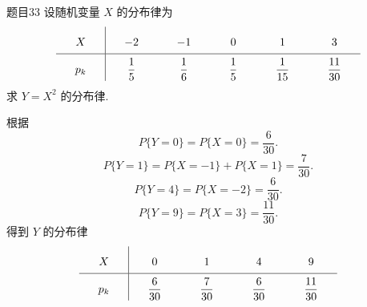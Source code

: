 \begin{question}{题目33}
    设随机变量 $X$ 的分布律为
    $$
        \renewcommand\arraystretch{2}
        \setlength{\arraycolsep}{6mm}
        \begin{array}{c|ccccc}
            X   & -2           & -1           & 0            & 1             & 3              \\
            \hline
            p_k & \dfrac{1}{5} & \dfrac{1}{6} & \dfrac{1}{5} & \dfrac{1}{15} & \dfrac{11}{30} \\
        \end{array}
    $$
    求 $Y=X^2$ 的分布律.
\end{question}
\begin{solution}
    根据
    $$
        P\{Y=0\} = P\{X=0\} = \frac{6}{30}.
    $$
    $$
        P\{Y=1\} = P\{X=-1\} + P\{X=1\} = \frac{7}{30}.
    $$
    $$
        P\{Y=4\} = P\{X=-2\} = \frac{6}{30}.
    $$
    $$
        P\{Y=9\} = P\{X=3\} = \frac{11}{30}.
    $$
    得到 $Y$ 的分布律
    $$
        \renewcommand\arraystretch{2}
        \setlength{\arraycolsep}{6mm}
        \begin{array}{c|cccc}
            X   & 0             & 1             & 4             & 9              \\
            \hline
            p_k & \dfrac{6}{30} & \dfrac{7}{30} & \dfrac{6}{30} & \dfrac{11}{30}
        \end{array}
    $$
\end{solution}


